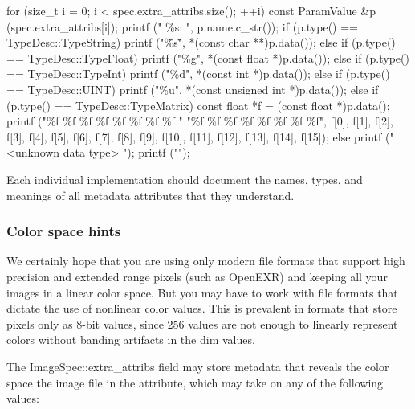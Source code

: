 \begin{code}
        for (size_t i = 0;  i < spec.extra_attribs.size();  ++i) {
            const ParamValue &p (spec.extra_attribs[i]);
            printf ("    \%s: ", p.name.c_str());
            if (p.type() == TypeDesc::TypeString)
                printf ("\"\%s\"", *(const char **)p.data());
            else if (p.type() == TypeDesc::TypeFloat)
                printf ("\%g", *(const float *)p.data());
            else if (p.type() == TypeDesc::TypeInt)
                printf ("\%d", *(const int *)p.data());
            else if (p.type() == TypeDesc::UINT)
                printf ("\%u", *(const unsigned int *)p.data());
            else if (p.type() == TypeDesc::TypeMatrix) {
                const float *f = (const float *)p.data();
                printf ("\%f \%f \%f \%f \%f \%f \%f \%f "
                        "\%f \%f \%f \%f \%f \%f \%f \%f",
                        f[0], f[1], f[2], f[3], f[4], f[5], f[6], f[7],
                        f[8], f[9], f[10], f[11], f[12], f[13], f[14], f[15]);
            }
            else
                printf (" <unknown data type> ");
            printf ("\n");
        }
\end{code}

Each individual \ImageInput implementation should document the names,
types, and meanings of all metadata attributes that they understand.

\subsubsection{Color space hints}

We certainly hope that you are using only modern file formats that
support high precision and extended range pixels (such as OpenEXR) and
keeping all your images in a linear color space.  But you may have to
work with file formats that dictate the use of nonlinear color values.
This is prevalent in formats that store pixels only as 8-bit values,
since 256 values are not enough to linearly represent colors without
banding artifacts in the dim values.

The {\cf ImageSpec::extra_attribs} field may store metadata that reveals
the color space the image file in the 
attribute, which may take on any of the following values:


